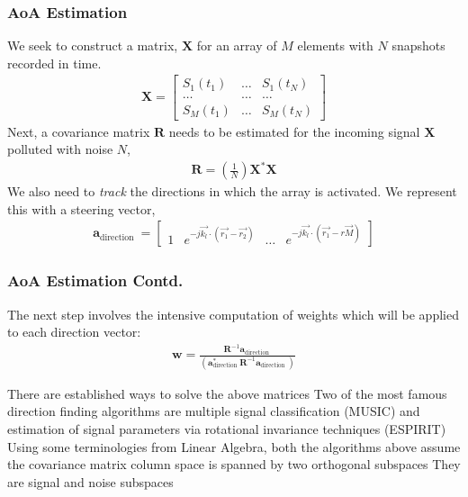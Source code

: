 \documentclass[10pt]{beamer}
\begin{document}
    \begin{frame}
        \frametitle{AoA Estimation}
    We seek to construct a matrix, $\mathbf{X}$ for an array of $M$ elements with $N$ snapshots recorded in time.        
    \begin{align*}
        \mathbf{X}=\left[\begin{array}{ccc}
            S_{1}\left(t_{1}\right) & \ldots & S_{1}\left(t_{N}\right) \\
            \ldots & \ldots & \ldots \\
            S_{M}\left(t_{1}\right) & \ldots & S_{M}\left(t_{N}\right)
            \end{array}\right]
    \end{align*}
    Next, a covariance matrix $\mathbf{R}$ needs to be estimated for the incoming signal $\mathbf{X}$ polluted with noise $N$,
    \begin{align*}
        \mathbf{R}=\left(\frac{1}{N}\right) \mathbf{X}^{*} \mathbf{X}
    \end{align*}
    We also need to \textit{track} the directions in which the array is activated. We represent this with a steering vector,
    \begin{align*}
        \mathbf{a}_{\text {direction }}=\left[\begin{array}{llll}
            1 & e^{-j \overrightarrow{k_{l}} \cdot\left(\overrightarrow{r_{1}}-\overrightarrow{r_{2}}\right)} & \ldots & e^{-j \overrightarrow{k_{l}} \cdot\left(\overrightarrow{r_{1}}-r \vec{M}\right)}
            \end{array}\right]
    \end{align*}
\end{frame}

\begin{frame}
    \frametitle{AoA Estimation Contd.}

    The next step involves the intensive computation of weights which will be applied to each direction vector:
    \begin{align*}
        \mathbf{w}=\frac{\mathbf{R}^{-1} \mathbf{a}_{\text {direction }}}{\left(\mathbf{a}_{\text {direction }}^{*} \mathbf{R}^{-1} \mathbf{a}_{\text {direction }}\right)}
    \end{align*} 
    
    \begin{outline}
        \1 There are established ways to solve the above matrices
        \1 Two of the most famous direction finding algorithms are  multiple signal classification (MUSIC) and estimation of signal parameters via rotational invariance techniques (ESPIRIT)
        \1 Using some terminologies from Linear Algebra, both the algorithms above assume the covariance matrix column space is spanned by two orthogonal subspaces
        \2 They are signal and noise subspaces
    \end{outline}

\end{frame}
\end{document}
